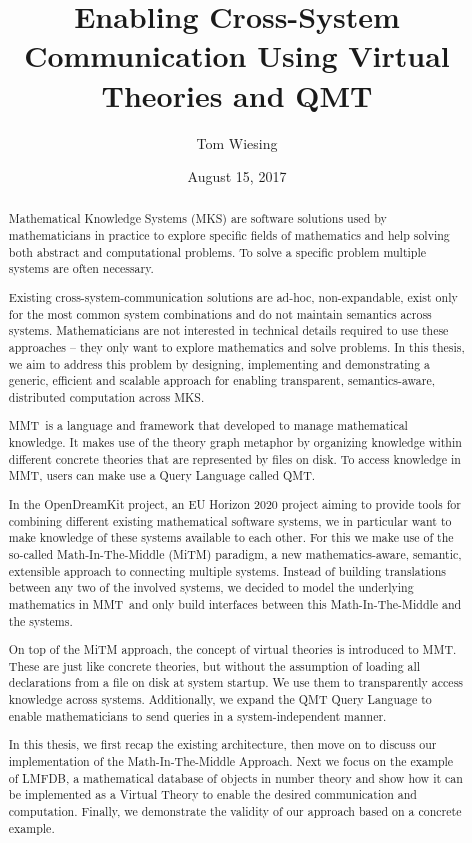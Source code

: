 \documentclass[12pt,a4paper]{article}
\title{Enabling Cross-System Communication Using Virtual Theories and QMT}
\author{Tom Wiesing}
\date{August 15, 2017}
\theoremstyle{remark}
\providecommand{\mmt}{MMT}
\providecommand{\lmfdb}{LMFDB}
\begin{document}
  
  
  
  \begin{abstract}
    Mathematical Knowledge Systems (MKS) are software solutions used by mathematicians in practice to explore specific fields of mathematics and help solving both abstract and computational problems. 
    To solve a specific problem multiple systems are often necessary. 
    
    Existing cross-system-communication solutions are ad-hoc, non-expandable, exist only for the most common system combinations and do not maintain semantics across systems. 
    Mathematicians are not interested in technical details required to use these approaches -- they only want to explore mathematics and solve problems. 
    In this thesis, we aim to address this problem by designing, implementing and demonstrating a generic, efficient and scalable approach for enabling transparent, semantics-aware, distributed computation across MKS. 
    
    \mmt\ is a language and framework that developed to manage mathematical knowledge. 
    It makes use of the theory graph metaphor by organizing knowledge within different concrete theories that are represented by files on disk. 
    To access knowledge in \mmt, users can make use a Query Language called QMT.
    
    In the OpenDreamKit project, an EU Horizon 2020 project aiming to provide tools for combining different existing mathematical software systems, we in particular want to make knowledge of these systems available to each other. 
    For this we make use of the so-called Math-In-The-Middle (MiTM) paradigm, a new mathematics-aware, semantic, extensible approach to connecting multiple systems. 
    Instead of building translations between any two of the involved systems, we decided to model the underlying mathematics in \mmt\ and only build interfaces between this Math-In-The-Middle and the systems. 
    
    On top of the MiTM approach, the concept of virtual theories is introduced to \mmt. 
    These are just like concrete theories, but without the assumption of loading all declarations from a file on disk at system startup. 
    We use them to transparently access knowledge across systems. 
    Additionally, we expand the QMT Query Language to enable mathematicians to send queries in a system-independent manner. 

    In this thesis, we first recap the existing architecture, then move on to discuss our implementation of the Math-In-The-Middle Approach. 
    Next we focus on the example of \lmfdb, a mathematical database of objects in number theory and show how it can be implemented as a Virtual Theory to enable the desired communication and computation. 
    Finally, we demonstrate the validity of our approach based on a concrete example. 
  \end{abstract}
\newpage
\end{document}
